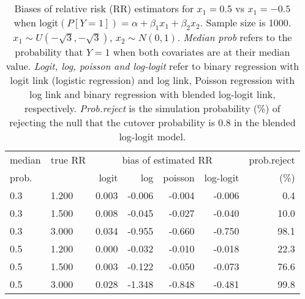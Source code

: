 \documentclass[12pt,a4paper]{article}
\begin{document}
\begin{table}[H] 
\small\sf\centering 
\caption{Biases of relative risk (RR) estimators for $x_1=0.5$ vs $x_1=-0.5$ when $\mbox{logit}(P[Y=1])=\alpha+\beta_1 x_1 + \beta_2 x_2$. Sample size is 1000. $x_1 \sim $$U(-\sqrt{3},-\sqrt{3})$, $x_2 \sim N(0,1)$. {\it Median prob} refers to the probability that $Y=1$ when both covariates are at their median value. {\it Logit, log, poisson and log-logit} refer to binary regression with logit link (logistic regression) and log link, Poisson regression with log link and binary regression with blended log-logit link, respectively. {\it Prob.reject} is the simulation probability (\%) of rejecting the null that the cutover probability is $0.8$ in the blended log-logit model.} 
\begin{tabular}{llrrrrr} 
\toprule 
median & true RR & \multicolumn{4}{c}{bias of estimated RR} & prob.reject \\ 
prob. & & logit & log & poisson & log-logit  & (\%) \\ \midrule 
0.3 & 1.200 & 0.003 & -0.006 & -0.004 & -0.006 &  0.4 \\  
0.3 & 1.500 & 0.008 & -0.045 & -0.027 & -0.040 & 10.0 \\  
0.3 & 3.000 & 0.034 & -0.955 & -0.660 & -0.750 & 98.1 \\  
0.5 & 1.200 & 0.000 & -0.032 & -0.010 & -0.018 & 22.3 \\  
0.5 & 1.500 & 0.003 & -0.122 & -0.050 & -0.073 & 76.6 \\  
0.5 & 3.000 & 0.028 & -1.348 & -0.848 & -0.481 & 99.8 \\  
\bottomrule 
\end{tabular} 
\end{table} 
\end{document}
